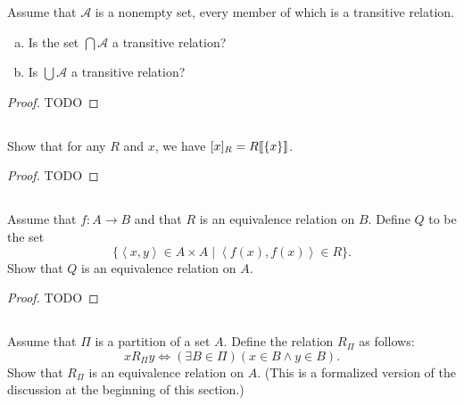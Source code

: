 \documentclass{report}
\begin{document}
Assume that $\mathscr{A}$ is a nonempty set, every member of which is a
  transitive relation.

\begin{enumerate}[(a)]
  \item Is the set $\bigcap{\mathscr{A}}$ a transitive relation?
  \item Is $\bigcup{\mathscr{A}}$ a transitive relation?
\end{enumerate}

\begin{proof}

  TODO

\end{proof}

\subsection{}%
\label{sub:exercise-3.35}

Show that for any $R$ and $x$, we have $[x]_R = R\!\left\llbracket\{x\}\right\rrbracket$.

\begin{proof}

  TODO

\end{proof}

\subsection{}%
\label{sub:exercise-3.36}

Assume that $f \colon A \rightarrow B$ and that $R$ is an equivalence relation
  on $B$.
Define $Q$ to be the set
  $$\{\left< x, y \right> \in A \times A \mid
    \left< f(x), f(x) \right> \in R\}.$$
Show that $Q$ is an equivalence relation on $A$.

\begin{proof}

  TODO

\end{proof}

\subsection{}%
\label{sub:exercise-3.37}

Assume that $\Pi$ is a partition of a set $A$.
Define the relation $R_\Pi$ as follows:
  $$xR_{\Pi}y \iff (\exists B \in \Pi)(x \in B \land y \in B).$$
Show that $R_\Pi$ is an equivalence relation on $A$.
(This is a formalized version of the discussion at the beginning of this
  section.)
\end{document}
